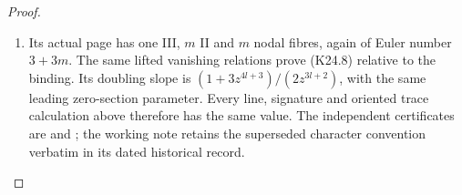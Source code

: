 \begin{proof}
\begin{enumerate}[label=\arabic*.]
\item Its actual page has one III, $m$ II and $m$ nodal fibres,
again of Euler number $3+3m$. The same lifted vanishing
relations prove (K24.8) relative to the binding. Its doubling
slope is $(1+3z^{4l+3})/(2z^{3l+2})$, with the same leading
zero-section parameter. Every line, signature and oriented
trace calculation above therefore has the same value. The
independent certificates are
 and
; the working
note retains the superseded character convention verbatim in
its dated historical record.

\end{enumerate}
\end{proof}
